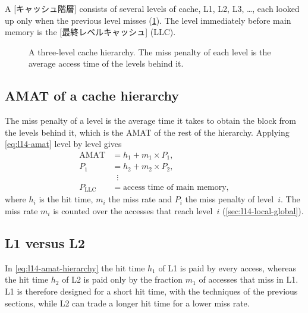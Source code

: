 \documentclass[../main.tex]{subfiles}
\begin{document}
\begin{definition}
  A [キャッシュ階層] consists of several levels of
  cache, L1, L2, L3, \ldots, each looked up only when the previous level
  misses (\cref{fig:l14-hierarchy}).  The level immediately before main
  memory is the [最終レベルキャッシュ]%
   (LLC).
\end{definition}

\begin{figure}[htbp]
  \centering
  
  \caption{A three-level cache hierarchy.  The miss penalty of each level is
    the average access time of the levels behind it.}
  \label{fig:l14-hierarchy}
\end{figure}

\subsection{AMAT of a cache hierarchy}

The miss penalty of a level is the average time it takes to obtain the block
from the levels behind it, which is the AMAT of the rest of the hierarchy.
Applying \cref{eq:l14-amat} level by level gives
\begin{equation}
  \begin{aligned}
    \text{AMAT} &= h_1 + m_1 \times P_1 , \\
    P_1 &= h_2 + m_2 \times P_2 , \\
    &\;\;\vdots \\
    P_{\text{LLC}} &= \text{access time of main memory},
  \end{aligned}
  \label{eq:l14-amat-hierarchy}
\end{equation}
where $h_i$ is the hit time, $m_i$ the miss rate and $P_i$ the miss penalty
of level~$i$.  The miss rate $m_i$ is counted over the accesses that reach
level~$i$ (\cref{sec:l14-local-global}).

\subsection{L1 versus L2}

In \cref{eq:l14-amat-hierarchy} the hit time $h_1$ of L1 is paid by every
access, whereas the hit time $h_2$ of L2 is paid only by the fraction $m_1$
of accesses that miss in L1.  L1 is therefore designed for a short hit time,
with the techniques of the previous sections, while L2 can trade a longer
hit time for a lower miss rate.
\end{document}
